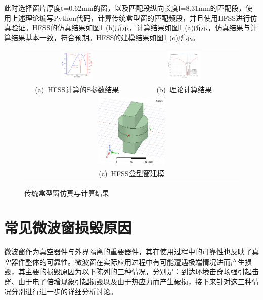 \documentclass[master]{thesis-uestc}
\begin{document}
此时选择窗片厚度t=0.62mm的窗，以及匹配段纵向长度l=8.31mm的匹配段，使用上述理论编写Python代码，计算传统盒型窗的匹配频段，并且使用HFSS进行仿真验证。HFSS的仿真结果如图\ref{fig:传统盒型窗仿真与计算结果} (b)所示，计算结果如图\ref{fig:传统盒型窗仿真与计算结果} (a)所示，仿真结果与计算结果基本一致，符合预期。HFSS的建模结果如图\ref{fig:传统盒型窗仿真与计算结果} (c)所示。

\begin{figure}[!htb]
    \small
    \centering
    \begin{tabular}{@{}c@{\hspace{5pt}}c@{}}
        \includegraphics[width=0.32\textwidth]{pic/chapter2/HFSS仿真结果.png} & 
        \includegraphics[width=0.32\textwidth]{pic/chapter2/理论计算结果.png} \\
        \mbox{\small (a) HFSS计算的S参数结果} & 
        \mbox{\small (b) 理论计算结果} \\
        \multicolumn{2}{c}{\includegraphics[width=0.32\textwidth]{pic/chapter2/HFSS盒型窗建模.png}} \\  %
        \multicolumn{2}{c}{\mbox{\small (c) HFSS盒型窗建模}}
    \end{tabular}
    \caption{传统盒型窗仿真与计算结果}
    \label{fig:传统盒型窗仿真与计算结果}
\end{figure}
\section{常见微波窗损毁原因}
微波窗作为真空器件与外界隔离的重要器件，其在使用过程中的可靠性也反映了真空器件整体的可靠性。微波窗在实际应用过程中有可能遭遇极端情况进而产生损毁，其主要的损毁原因为以下陈列的三种情况，分别是：到达环境击穿场强引起击穿、由于电子倍增现象引起损毁以及由于热应力而产生破损，接下来针对这三种情况分别进行进一步的详细分析讨论。
\end{document}
